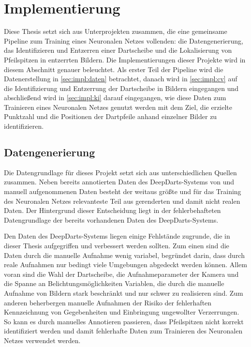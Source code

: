 
\chapter{Implementierung}

Diese Thesis setzt sich aus Unterprojekten zusammen, die eine gemeinsame Pipeline zum Training eines Neuronalen Netzes vollenden: die Datengenerierung, das Identifizieren und Entzerren einer Dartscheibe und die Lokalisierung von Pfeilspitzen in entzerrten Bildern. Die Implementierungen dieser Projekte wird in diesem Abschnitt genauer beleuchtet. Als erster Teil der Pipeline wird die Datenerstellung in \autoref{sec:impl:daten} betrachtet, danach wird in \autoref{sec:impl:cv} auf die Identifizierung und Entzerrung der Dartscheibe in Bildern eingegangen und abschließend wird in \autoref{sec:impl:ki} darauf eingegangen, wie diese Daten zum Trainieren eines Neuronalen Netzes genutzt werden mit dem Ziel, die erzielte Punktzahl und die Positionen der Dartpfeile anhand einzelner Bilder zu identifizieren.

\section{Datengenerierung}
\label{sec:impl:daten}

Die Datengrundlage für dieses Projekt setzt sich aus unterschiedlichen Quellen zusammen. Neben bereits annotierten Daten des DeepDarts-Systems von \citeauthor{deepdarts} \cite{deepdarts-data} und manuell aufgenommenen Daten besteht der weitaus größte und für das Training des Neuronalen Netzes relevanteste Teil aus gerenderten und damit nicht realen Daten. Der Hintergrund dieser Entscheidung liegt in der fehlerbehafteten Datengrundlage der bereits vorhandenen Daten des DeepDarts-Systems.

Den Daten des DeepDarts-Systems liegen einige Fehlstände zugrunde, die in dieser Thesis aufgegriffen und verbessert werden sollten. Zum einen sind die Daten durch die manuelle Aufnahme wenig variabel, begründet darin, dass durch reale Aufnahmen nur bedingt viele Umgebungen abgedeckt werden können. Allem voran sind die Wahl der Dartscheibe, die Aufnahmeparameter der Kamera und die Spanne an Belichtungsmöglichkeiten Variablen, die durch die manuelle Aufnahme von Bildern stark beschränkt und nur schwer zu realisieren sind. Zum anderen beherbergen manuelle Aufnahmen der Risiko der fehlerhaften Kennzeichnung von Gegebenheiten und Einbringung ungewollter Verzerrungen. So kann es durch manuelles Annotieren passieren, dass Pfeilspitzen nicht korrekt identifiziert werden und damit fehlerhafte Daten zum Trainieren des Neuronalen Netzes verwendet werden.

